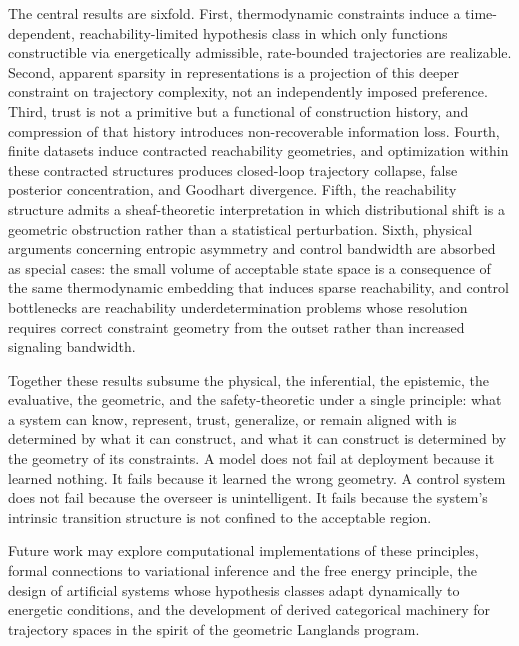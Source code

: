 \documentclass[12pt]{article}
\theoremstyle{plain}
\theoremstyle{definition}
\theoremstyle{remark}
\begin{document}
The central results are sixfold. First, thermodynamic constraints induce a time-dependent, reachability-limited hypothesis class in which only functions constructible via energetically admissible, rate-bounded trajectories are realizable. Second, apparent sparsity in representations is a projection of this deeper constraint on trajectory complexity, not an independently imposed preference. Third, trust is not a primitive but a functional of construction history, and compression of that history introduces non-recoverable information loss. Fourth, finite datasets induce contracted reachability geometries, and optimization within these contracted structures produces closed-loop trajectory collapse, false posterior concentration, and Goodhart divergence. Fifth, the reachability structure admits a sheaf-theoretic interpretation in which distributional shift is a geometric obstruction rather than a statistical perturbation. Sixth, physical arguments concerning entropic asymmetry and control bandwidth are absorbed as special cases: the small volume of acceptable state space is a consequence of the same thermodynamic embedding that induces sparse reachability, and control bottlenecks are reachability underdetermination problems whose resolution requires correct constraint geometry from the outset rather than increased signaling bandwidth.

Together these results subsume the physical, the inferential, the epistemic, the evaluative, the geometric, and the safety-theoretic under a single principle: what a system can know, represent, trust, generalize, or remain aligned with is determined by what it can construct, and what it can construct is determined by the geometry of its constraints. A model does not fail at deployment because it learned nothing. It fails because it learned the wrong geometry. A control system does not fail because the overseer is unintelligent. It fails because the system's intrinsic transition structure is not confined to the acceptable region.

Future work may explore computational implementations of these principles, formal connections to variational inference and the free energy principle, the design of artificial systems whose hypothesis classes adapt dynamically to energetic conditions, and the development of derived categorical machinery for trajectory spaces in the spirit of the geometric Langlands program.
\end{document}
